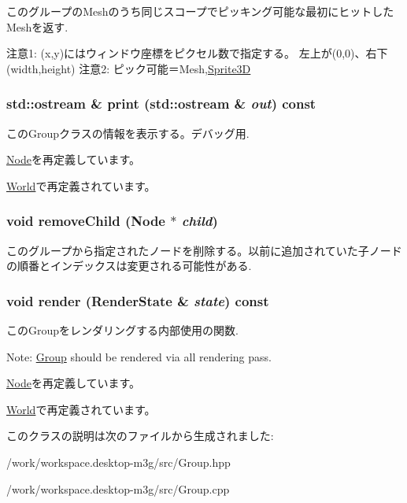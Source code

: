 このグループのMeshのうち同じスコープでピッキング可能な最初にヒットしたMeshを返す.

注意1: (x,y)にはウィンドウ座標をピクセル数で指定する。 左上が(0,0)、右下(width,height) 注意2: ピック可能＝Mesh,\hyperlink{classm3g_1_1Sprite3D}{Sprite3D} \hypertarget{classm3g_1_1Group_6fea17fa1532df3794f8cb39cb4f911f}{
\subsubsection[{print}]{\setlength{\rightskip}{0pt plus 5cm}std::ostream \& print (std::ostream \& {\em out}) const}}
\label{classm3g_1_1Group_6fea17fa1532df3794f8cb39cb4f911f}


このGroupクラスの情報を表示する。デバッグ用. 

\hyperlink{classm3g_1_1Node_6fea17fa1532df3794f8cb39cb4f911f}{Node}を再定義しています。

\hyperlink{classm3g_1_1World_6fea17fa1532df3794f8cb39cb4f911f}{World}で再定義されています。\hypertarget{classm3g_1_1Group_7415646c6f397f080d198176df44395c}{
\subsubsection[{removeChild}]{\setlength{\rightskip}{0pt plus 5cm}void removeChild ({\bf Node} $\ast$ {\em child})}}
\label{classm3g_1_1Group_7415646c6f397f080d198176df44395c}


このグループから指定されたノードを削除する。以前に追加されていた子ノードの順番とインデックスは変更される可能性がある. \hypertarget{classm3g_1_1Group_8babc8a79b78615da51161e94029eea9}{
\subsubsection[{render}]{\setlength{\rightskip}{0pt plus 5cm}void render ({\bf RenderState} \& {\em state}) const}}
\label{classm3g_1_1Group_8babc8a79b78615da51161e94029eea9}


このGroupをレンダリングする内部使用の関数.

Note: \hyperlink{classm3g_1_1Group}{Group} should be rendered via all rendering pass. 

\hyperlink{classm3g_1_1Node_8babc8a79b78615da51161e94029eea9}{Node}を再定義しています。

\hyperlink{classm3g_1_1World_8babc8a79b78615da51161e94029eea9}{World}で再定義されています。

このクラスの説明は次のファイルから生成されました:\begin{CompactItemize}
\item 
/work/workspace.desktop-m3g/src/Group.hpp\item 
/work/workspace.desktop-m3g/src/Group.cpp\end{CompactItemize}
